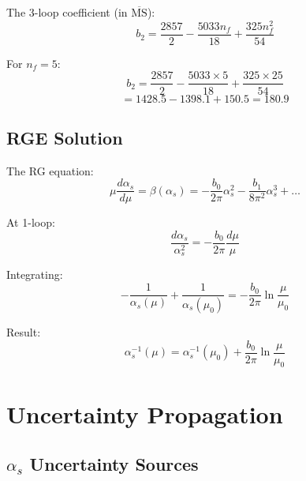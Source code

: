 \documentclass[11pt,a4paper]{article}
\theoremstyle{definition}
\begin{document}
The 3-loop coefficient (in $\overline{\text{MS}}$):
\begin{equation}
\label{eq:b2-formula-app}
b_2 = \frac{2857}{2} - \frac{5033n_f}{18} + \frac{325n_f^2}{54}
\end{equation}

For $n_f = 5$:
\begin{equation}
\label{eq:b2-nf5-calc}
b_2 = \frac{2857}{2} - \frac{5033 \times 5}{18} + \frac{325 \times 25}{54}
\end{equation}
\begin{equation}
\label{eq:b2-nf5-value}
= 1428.5 - 1398.1 + 150.5 = 180.9
\end{equation}

\subsection{RGE Solution}
\label{subsec:rge-solution-app}

The RG equation:
\begin{equation}
\label{eq:rge-def-app}
\mu\frac{d\alpha_s}{d\mu} = \beta(\alpha_s) = -\frac{b_0}{2\pi}\alpha_s^2 - \frac{b_1}{8\pi^2}\alpha_s^3 + \ldots
\end{equation}

At 1-loop:
\begin{equation}
\label{eq:rge-1loop-solve}
\frac{d\alpha_s}{\alpha_s^2} = -\frac{b_0}{2\pi}\frac{d\mu}{\mu}
\end{equation}

Integrating:
\begin{equation}
\label{eq:rge-1loop-integrate}
-\frac{1}{\alpha_s(\mu)} + \frac{1}{\alpha_s(\mu_0)} = -\frac{b_0}{2\pi}\ln\frac{\mu}{\mu_0}
\end{equation}

Result:
\begin{equation}
\label{eq:rge-1loop-result}
\alpha_s^{-1}(\mu) = \alpha_s^{-1}(\mu_0) + \frac{b_0}{2\pi}\ln\frac{\mu}{\mu_0}
\end{equation}

\section{Uncertainty Propagation}
\label{app:uncertainty}

\subsection{$\alpha_s$ Uncertainty Sources}
\label{subsec:alpha-uncert-sources}
\end{document}
